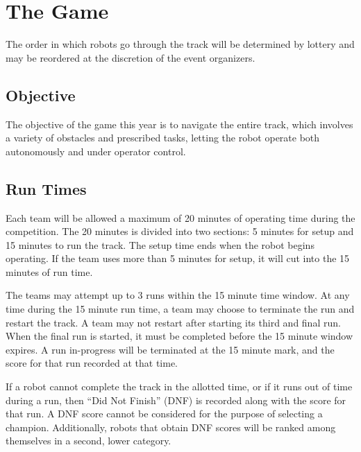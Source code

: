 \section{The Game}
The order in which robots go through the track will be determined by lottery and may be reordered at the discretion of the event organizers. 

\subsection{Objective}
The objective of the game this year is to navigate the entire track, which involves a variety of obstacles and prescribed tasks, letting the robot operate both autonomously and under operator control.

\subsection{Run Times}
Each team will be allowed a maximum of 20 minutes of operating time during the competition. The 20 minutes is divided into two sections: 5 minutes for setup and 15 minutes to run the track. The setup time ends when the robot begins operating. If the team uses more than 5 minutes for setup, it will cut into the 15 minutes of run time. 

The teams may attempt up to 3 runs within the 15 minute time window. At any time during the 15 minute run time, a team may choose to terminate the run and restart the track. A team may not restart after starting its third and final run. When the final run is started, it must be completed before the 15 minute window expires. A run in-progress will be terminated at the 15 minute mark, and the score for that run recorded at that time.

If a robot cannot complete the track in the allotted time, or if it runs out of time during a run, then “Did Not Finish” (DNF) is recorded along with the score for that run. A DNF score cannot be considered for the purpose of selecting a champion. Additionally, robots that obtain DNF scores will be ranked among themselves in a second, lower category. 

